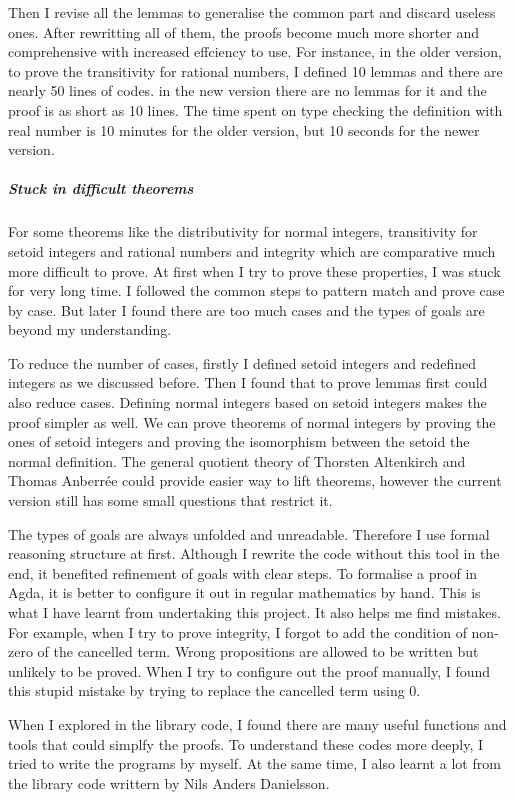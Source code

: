 \documentclass{article}
\theoremstyle{definition}
\begin{document}
Then I revise all the lemmas to generalise the common part and discard useless ones. After rewritting all of them, the proofs become much more shorter and comprehensive with increased effciency to use. For instance, in the older version, to prove the transitivity for rational numbers, I defined 10 lemmas and there are nearly 50 lines of codes. in the new version there are no lemmas for it and the proof is as short as 10 lines. The time spent on type checking the definition with real number is 10 minutes for the older version, but 10 seconds for the newer version.

\subparagraph{Stuck in difficult theorems} For some theorems like the distributivity for normal integers, transitivity for setoid integers and rational numbers and integrity which are comparative much more difficult to prove. At first when I try to prove these properties, I was stuck for very long time. I followed the common steps to pattern match and prove case by case. 
But later I found there are too much cases and the types of goals are beyond my understanding.

To reduce the number of cases, firstly I defined setoid integers and redefined integers as we discussed before. Then I found that to prove lemmas first could also reduce cases. Defining normal integers based on setoid integers makes the proof simpler as well. We can prove theorems of normal integers by proving the ones of setoid integers and proving the isomorphism between the setoid the normal definition. The general quotient theory of Thorsten Altenkirch and Thomas Anberrée could provide easier way to lift theorems, however the current version still has some small questions that restrict it.

The types of goals are always unfolded and unreadable. Therefore I use formal reasoning structure at first. Although I rewrite the code without this tool in the end, it benefited refinement of goals with clear steps. To formalise a proof in Agda, it is better to configure it out in regular mathematics by hand. This is what I have learnt from undertaking this project. It also helps me find mistakes. For example, when I try to prove integrity, I forgot to add the condition of non-zero of the cancelled term. Wrong propositions are allowed to be written but unlikely to be proved. When I try to configure out the proof manually, I found this stupid mistake by trying to replace the cancelled term using 0.

When I explored in the library code, I found there are many useful functions and tools that could simplfy the proofs. To understand these codes more deeply, I tried to write the programs by myself. At the same time, I also learnt a lot from the library code writtern by Nils Anders Danielsson.
\end{document}

